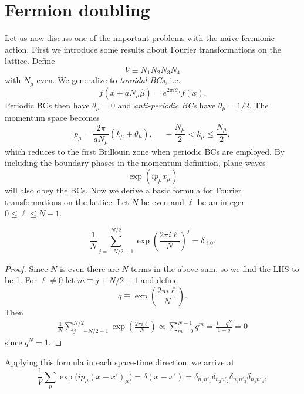 \section{Fermion doubling}\label{sec:LFTdoubling}
Let us now discuss one of the important problems with the naive fermionic
action. First we introduce some results about Fourier transformations on the
lattice. Define
\begin{equation}
V\equiv N_1N_2N_3N_4
\end{equation}
with $N_\mu$ even.
We generalize to {\it toroidal BCs}, i.e.
\begin{equation}
  f(x+aN_\mu\hat{\mu})=e^{2\pi i\theta_\mu}f(x).
\end{equation}
Periodic BCs then have $\theta_\mu=0$ and {\it anti-periodic BCs} have
$\theta_\mu=1/2$. The momentum space becomes
\begin{equation}
  p_\mu=\frac{2\pi}{aN_\mu}(k_\mu+\theta_\mu),~~~~~~
   -\frac{N_\mu}{2}<k_\mu\leq\frac{N_\mu}{2},
\end{equation}
which reduces to the first Brillouin zone when periodic BCs are employed. By
including the boundary phases in the momentum definition, plane waves
\begin{equation}
  \exp(ip_\mu x_\mu)
\end{equation}
will also obey the BCs. Now we derive a basic formula for Fourier
transformations on the lattice. Let $N$ be even and $\ell$ be an integer
$0\leq\ell\leq N-1$.
\begin{proposition}{}{}
$$
  \frac{1}{N}\sum_{j=-N/2+1}^{N/2}\exp(\frac{2\pi i\ell}{N})^j=\delta_{\ell 0}.
$$
\begin{proof} Since $N$ is even there are $N$ terms in the above sum,
  so we find the LHS to be 1. For $\ell\neq 0$ let
  $m\equiv j+N/2+1$ and define
  $$
    q\equiv\exp(\frac{2\pi i\ell}{N}).
  $$
  Then
  \begin{equation*}\begin{aligned}
    \frac{1}{N}\sum_{j=-N/2+1}^{N/2}\exp(\frac{2\pi i\ell}{N})
      \propto\sum_{m=0}^{N-1}q^m
      =\frac{1-q^N}{1-q}=0
  \end{aligned}\end{equation*}
  since $q^N=1$.
\end{proof}
\end{proposition}
Applying this formula in each space-time direction, we arrive at
\begin{equation}
  \frac{1}{V}\sum_p\exp\big(ip_\mu(x-x')_\mu\big)
  =\delta(x-x')
  =\delta_{n_1n'_1}\delta_{n_2n'_2}\delta_{n_3n'_3}\delta_{n_4n'_4},
\end{equation}
